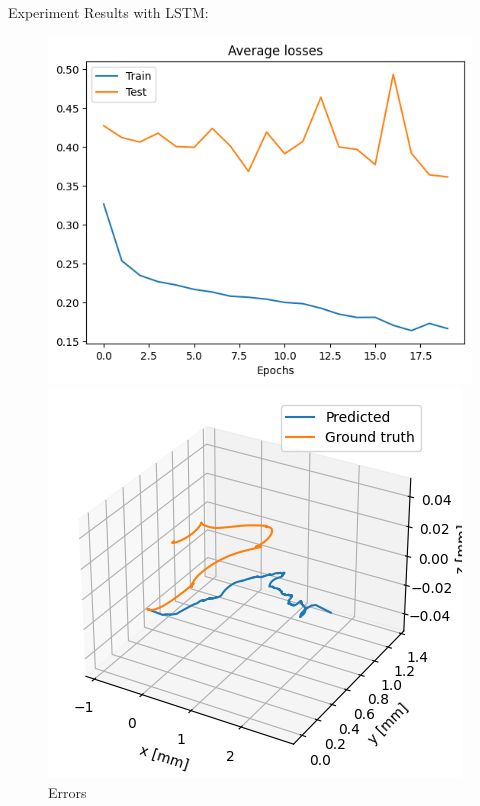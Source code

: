 \documentclass[aspectratio=169,t,xcolor=table]{beamer}
\begin{document}
\begin{frame}[allowframebreaks]{Experiment}
Results with LSTM:
\begin{figure}[!htb]
    \begin{center}
        \begin{minipage}{0.45\textwidth}
            \centering
            \includegraphics[width=\linewidth]{../outputs/lstmError.png}
            \caption{Errors}\label{graph1}
        \end{minipage}
        \hfill
        \begin{minipage}{0.45\textwidth}
            \centering
            \includegraphics[width=\linewidth]{../outputs/lstmTrajectory.png}

\end{minipage}
\end{center}
\end{figure}
\end{frame}
\end{document}
